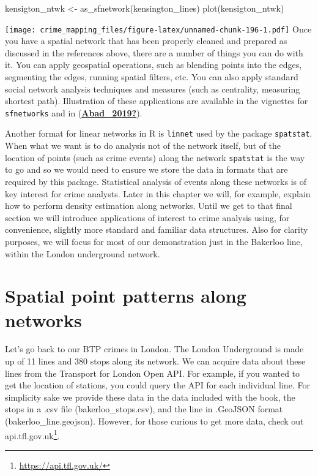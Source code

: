 \documentclass[
  krantz2]{krantz}
\makeatletter
\newenvironment{Shaded}{\begin{snugshade}}{\end{snugshade}}
\newcommand{\FunctionTok}[1]{\textcolor[rgb]{0,0,0}{#1}}
\newcommand{\NormalTok}[1]{#1}
\newcommand{\OtherTok}[1]{\textcolor[rgb]{0.37,0.37,0.37}{#1}}
\renewcommand{\href}[2]{#2\footnote{\url{#1}}}
\newenvironment{kframe}{%
\medskip{}
\setlength{\fboxsep}{.8em}
 \def\at@end@of@kframe{}%
 \ifinner\ifhmode%
  \def\at@end@of@kframe{\end{minipage}}%
  \begin{minipage}{\columnwidth}%
 \fi\fi%
 \def\FrameCommand##1{\hskip\@totalleftmargin \hskip-\fboxsep
 \colorbox{shadecolor}{##1}\hskip-\fboxsep
     \hskip-\linewidth \hskip-\@totalleftmargin \hskip\columnwidth}%
 \MakeFramed {\advance\hsize-\width
   \@totalleftmargin\z@ \linewidth\hsize
   \@setminipage}}%
 {\par\unskip\endMakeFramed%
 \at@end@of@kframe}
\renewenvironment{Shaded}{\begin{kframe}}{\end{kframe}}
\makeatother
\begin{document}
\begin{Shaded}
\begin{Highlighting}[]
\NormalTok{kensigton\_ntwk }\OtherTok{\textless{}{-}} \FunctionTok{as\_sfnetwork}\NormalTok{(kensington\_lines)}
\FunctionTok{plot}\NormalTok{(kensigton\_ntwk)}
\end{Highlighting}
\end{Shaded}

\texttt{[image: crime\_mapping\_files/figure-latex/unnamed-chunk-196-1.pdf]}
Once you have a spatial network that has been properly cleaned and prepared as discussed in the references above, there are a number of things you can do with it. You can apply geospatial operations, such as blending points into the edges, segmenting the edges, running spatial filters, etc. You can also apply standard social network analysis techniques and measures (such as centrality, measuring shortest path). Illustration of these applications are available in the vignettes for \texttt{sfnetworks} and in (\protect\hyperlink{ref-Abad_2019}{\textbf{Abad\_2019?}}).

Another format for linear networks in R is \texttt{linnet} used by the package \texttt{spatstat}. When what we want is to do analysis not of the network itself, but of the location of points (such as crime events) along the network \texttt{spatstat} is the way to go and so we would need to ensure we store the data in formats that are required by this package. Statistical analysis of events along these networks is of key interest for crime analysts. Later in this chapter we will, for example, explain how to perform density estimation along networks. Until we get to that final section we will introduce applications of interest to crime analysis using, for convenience, slightly more standard and familiar data structures. Also for clarity purposes, we will focus for most of our demonstration just in the Bakerloo line, within the London underground network.

\hypertarget{spatial-point-patterns-along-networks}{%
\section{Spatial point patterns along networks}\label{spatial-point-patterns-along-networks}}

Let's go back to our BTP crimes in London. The London Underground is made up of 11 lines and 380 stops along its network. We can acquire data about these lines from the Transport for London Open API. For example, if you wanted to get the location of stations, you could query the API for each individual line. For simplicity sake we provide these data in the data included with the book, the stops in a .csv file (bakerloo\_stops.csv), and the line in .GeoJSON format (bakerloo\_line.geojson). However, for those curious to get more data, check out \href{https://api.tfl.gov.uk/}{api.tfl.gov.uk}.
\end{document}
